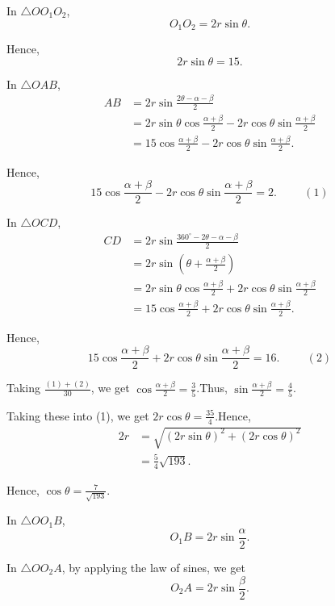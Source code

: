 \begin{enumerate}
 In $\triangle O O_1 O_2$, 
 \[ O_1 O_2 = 2 r \sin \theta .  \]

 Hence, 
 \[ 2 r \sin \theta = 15 .  \]

 In $\triangle O AB$, 
 \begin{align*} AB & = 2 r \sin \frac{2 \theta - \alpha - \beta}{2} \\ & = 2 r \sin \theta \cos \frac{\alpha + \beta}{2} - 2 r \cos \theta \sin \frac{\alpha + \beta}{2} \\ & = 15 \cos \frac{\alpha + \beta}{2} - 2 r \cos \theta \sin \frac{\alpha + \beta}{2} . \end{align*}


 Hence,
 \[ 15 \cos \frac{\alpha + \beta}{2} - 2 r \cos \theta \sin \frac{\alpha + \beta}{2} = 2 . \hspace{1cm} (1) \]

 
In $\triangle O CD$, 
 \begin{align*} CD & = 2 r \sin \frac{360^\circ - 2 \theta - \alpha - \beta}{2} \\ & = 2 r \sin \left( \theta + \frac{\alpha + \beta}{2} \right) \\ & = 2 r \sin \theta \cos \frac{\alpha + \beta}{2} + 2 r \cos \theta \sin \frac{\alpha + \beta}{2} \\ & = 15 \cos \frac{\alpha + \beta}{2} + 2 r \cos \theta \sin \frac{\alpha + \beta}{2} . \end{align*}


 Hence,
 \[ 15 \cos \frac{\alpha + \beta}{2} + 2 r \cos \theta \sin \frac{\alpha + \beta}{2} = 16 . \hspace{1cm} (2) \]

 Taking $\frac{(1) + (2)}{30}$, we get $\cos \frac{\alpha + \beta}{2} = \frac{3}{5}$.Thus, $\sin \frac{\alpha + \beta}{2} = \frac{4}{5}$.

 Taking these into (1), we get $2 r \cos \theta = \frac{35}{4}$.Hence,
 \begin{align*} 2 r & = \sqrt{ \left( 2 r \sin \theta \right)^2 + \left( 2 r \cos \theta \right)^2} \\ & = \frac{5}{4} \sqrt{193} .  \end{align*}


 Hence, $\cos \theta = \frac{7}{\sqrt{193}}$.

 In $\triangle O O_1 B$,  
 \[ O_1 B = 2 r \sin \frac{\alpha}{2} .   \]

 In $\triangle O O_2 A$, by applying the law of sines, we get
 \[ O_2 A = 2 r \sin \frac{\beta}{2} .   \]


\end{enumerate}
